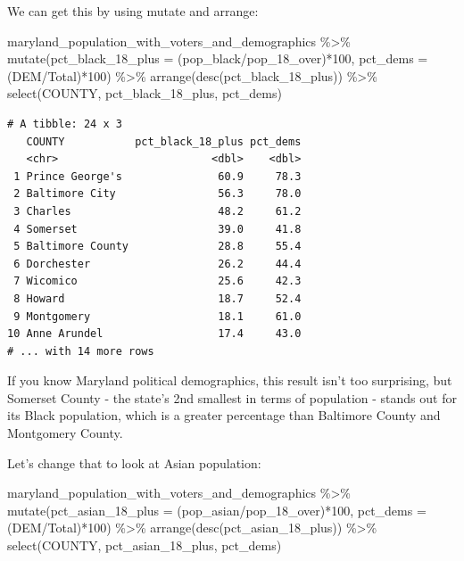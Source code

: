 \documentclass[
  letterpaper,
  DIV=11,
  numbers=noendperiod]{scrreprt}
\newenvironment{Shaded}{\begin{snugshade}}{\end{snugshade}}
\newcommand{\AttributeTok}[1]{\textcolor[rgb]{0.40,0.45,0.13}{#1}}
\newcommand{\DecValTok}[1]{\textcolor[rgb]{0.68,0.00,0.00}{#1}}
\newcommand{\FunctionTok}[1]{\textcolor[rgb]{0.28,0.35,0.67}{#1}}
\newcommand{\NormalTok}[1]{\textcolor[rgb]{0.00,0.23,0.31}{#1}}
\newcommand{\SpecialCharTok}[1]{\textcolor[rgb]{0.37,0.37,0.37}{#1}}
\begin{document}
We can get this by using mutate and arrange:

\begin{Shaded}
\begin{Highlighting}[]
\NormalTok{maryland\_population\_with\_voters\_and\_demographics }\SpecialCharTok{\%\textgreater{}\%}
  \FunctionTok{mutate}\NormalTok{(}\AttributeTok{pct\_black\_18\_plus =}\NormalTok{ (pop\_black}\SpecialCharTok{/}\NormalTok{pop\_18\_over)}\SpecialCharTok{*}\DecValTok{100}\NormalTok{, }\AttributeTok{pct\_dems =}\NormalTok{ (DEM}\SpecialCharTok{/}\NormalTok{Total)}\SpecialCharTok{*}\DecValTok{100}\NormalTok{) }\SpecialCharTok{\%\textgreater{}\%} 
  \FunctionTok{arrange}\NormalTok{(}\FunctionTok{desc}\NormalTok{(pct\_black\_18\_plus)) }\SpecialCharTok{\%\textgreater{}\%} 
  \FunctionTok{select}\NormalTok{(COUNTY, pct\_black\_18\_plus, pct\_dems)}
\end{Highlighting}
\end{Shaded}

\begin{verbatim}
# A tibble: 24 x 3
   COUNTY           pct_black_18_plus pct_dems
   <chr>                        <dbl>    <dbl>
 1 Prince George's               60.9     78.3
 2 Baltimore City                56.3     78.0
 3 Charles                       48.2     61.2
 4 Somerset                      39.0     41.8
 5 Baltimore County              28.8     55.4
 6 Dorchester                    26.2     44.4
 7 Wicomico                      25.6     42.3
 8 Howard                        18.7     52.4
 9 Montgomery                    18.1     61.0
10 Anne Arundel                  17.4     43.0
# ... with 14 more rows
\end{verbatim}

If you know Maryland political demographics, this result isn't too
surprising, but Somerset County - the state's 2nd smallest in terms of
population - stands out for its Black population, which is a greater
percentage than Baltimore County and Montgomery County.

Let's change that to look at Asian population:

\begin{Shaded}
\begin{Highlighting}[]
\NormalTok{maryland\_population\_with\_voters\_and\_demographics }\SpecialCharTok{\%\textgreater{}\%}
  \FunctionTok{mutate}\NormalTok{(}\AttributeTok{pct\_asian\_18\_plus =}\NormalTok{ (pop\_asian}\SpecialCharTok{/}\NormalTok{pop\_18\_over)}\SpecialCharTok{*}\DecValTok{100}\NormalTok{, }\AttributeTok{pct\_dems =}\NormalTok{ (DEM}\SpecialCharTok{/}\NormalTok{Total)}\SpecialCharTok{*}\DecValTok{100}\NormalTok{) }\SpecialCharTok{\%\textgreater{}\%} 
  \FunctionTok{arrange}\NormalTok{(}\FunctionTok{desc}\NormalTok{(pct\_asian\_18\_plus)) }\SpecialCharTok{\%\textgreater{}\%} 
  \FunctionTok{select}\NormalTok{(COUNTY, pct\_asian\_18\_plus, pct\_dems)}
\end{Highlighting}
\end{Shaded}
\end{document}
